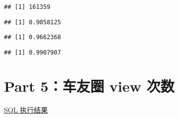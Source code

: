 \documentclass[]{article}
\newenvironment{Shaded}{\begin{snugshade}}{\end{snugshade}}
\newcommand{\KeywordTok}[1]{\textcolor[rgb]{0.13,0.29,0.53}{\textbf{#1}}}
\newcommand{\DecValTok}[1]{\textcolor[rgb]{0.00,0.00,0.81}{#1}}
\newcommand{\StringTok}[1]{\textcolor[rgb]{0.31,0.60,0.02}{#1}}
\newcommand{\OperatorTok}[1]{\textcolor[rgb]{0.81,0.36,0.00}{\textbf{#1}}}
\newcommand{\NormalTok}[1]{#1}
\begin{document}
\begin{verbatim}
## [1] 161359
\end{verbatim}

\begin{Shaded}
\end{Shaded}

\begin{verbatim}
## [1] 0.9058125
\end{verbatim}

\begin{Shaded}
\end{Shaded}

\begin{verbatim}
## [1] 0.9662368
\end{verbatim}

\begin{Shaded}
\end{Shaded}

\begin{verbatim}
## [1] 0.9907907
\end{verbatim}

\section{Part 5：车友圈 view 次数}\label{part-5-view-}

\href{https://data.bytedance.net/aeolus/\#/queryEditor/query/45f906f434cdb80e?group=default\&blockId=1828921\&taskId=6507801}{SQL
执行结果}
\end{document}
